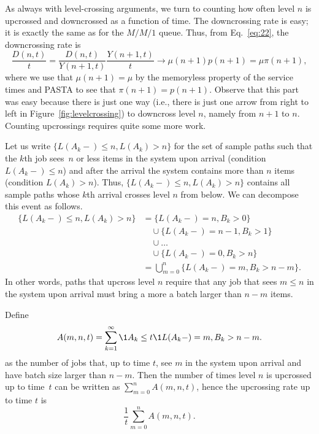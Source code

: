 As always with level-crossing arguments, we turn to counting how often
level $n$ is upcrossed and downcrossed as a function of time. The
downcrossing rate is easy; it is exactly the same as for the $M/M/1$
queue. Thus, from Eq.~\eqref{eq:22}, the downcrossing rate is
\begin{equation}
\frac{D(n,t)}t = \frac{D(n,t)}{Y(n+1,t)}\frac{Y(n+1,t)}t \to  \mu(n+1) p(n+1) = \mu \pi(n+1),
\end{equation}
where we use that $\mu(n+1) = \mu$ by the memoryless property of the
service times and PASTA to see that $\pi(n+1)=p(n+1)$.  Observe that
this part was easy because there is just one way (i.e., there is just
one arrow from right to left in Figure~\ref{fig:levelcrossing}) to
downcross level $n$, namely from $n+1$ to $n$. Counting upcrossings
requires quite some more work.

Let us write $\{L(A_k-) \leq n, L(A_k)>n\}$ for the set of sample
paths such that the $k$th job sees~$n$ or less items in the system
upon arrival (condition $L(A_k-)\leq n$) and after the arrival the
system contains more than $n$ items (condition $L(A_k) > n$). Thus,
$\{L(A_k-) \leq n, L(A_k)>n\}$ contains all sample paths whose $k$th
arrival crosses level $n$ from below. We can decompose this event as
follows.
\begin{equation*}
  \begin{split}
    \{L(A_k-) \leq n, L(A_k)>n\} 
&=  \{L(A_k-) =n , B_k >0\} \\
&\quad \cup  \{L(A_k-) =n-1 , B_k >1\} \\
&\quad \cup \ldots\\
&\quad \cup  \{L(A_k-) =0 , B_k > n\} \\
& = \bigcup_{m=0}^n \{L(A_k-) =m , B_k > n-m\}.
  \end{split}
\end{equation*}
In other words, paths that upcross level $n$ require that any job that
sees $m\leq n$ in the system upon arrival must bring a more a batch
larger than $n-m$ items. 

Define 
\begin{equation*}
  A(m,n,t) = \sum_{k=1}^\infty \1{A_k \leq t}\1{L(A_k-) = m, B_k > n-m}.
\end{equation*}
as the number of jobs that, up to time $t$, see $m$ in the system upon
arrival and have batch size larger than $n-m$. Then the number of
times level $n$ is upcrossed up to time~$t$ can be written as
$\sum_{m=0}^n A(m,n,t)$, hence the upcrossing rate up to time $t$ is
\begin{equation*}
\frac 1t  \sum_{m=0}^n A(m,n,t).
\end{equation*}

